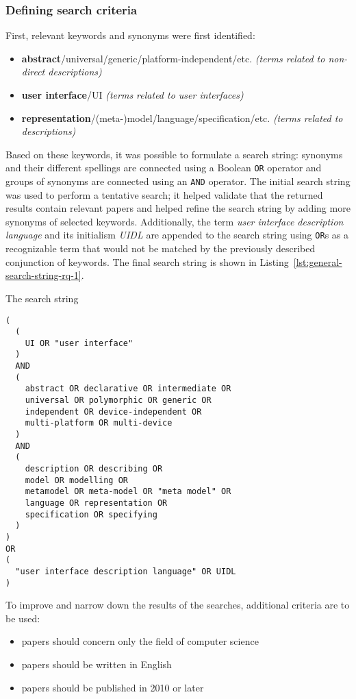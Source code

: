 \subsubsection{Defining search criteria}
First, relevant keywords and synonyms were first identified:
\begin{itemize}
    \item \textbf{abstract}/universal/generic/platform-independent/etc. \textit{(terms related to non-direct descriptions)}
    \item \textbf{user interface}/UI \textit{(terms related to user interfaces)}
    \item \textbf{representation}/(meta-)model/language/specification/etc. \textit{(terms related to descriptions)}
\end{itemize}
Based on these keywords, it was possible to formulate a search string: synonyms and their different spellings are connected using a Boolean \texttt{OR} operator and groups of synonyms are connected using an \texttt{AND} operator.
The initial search string was used to perform a tentative search;
it helped validate that the returned results contain relevant papers and helped refine the search string by adding more synonyms of selected keywords.
Additionally, the term \emph{user interface description language} and its initialism \emph{UIDL} are appended to the search string using \texttt{OR}s as a recognizable term that would not be matched by the previously described conjunction of keywords.
The final search string is shown in Listing~\ref{lst:general-search-string-rq-1}.
\begin{listing}
    \caption{The search string}
    \begin{verbatim}
(
  (
    UI OR "user interface"
  )
  AND
  (
    abstract OR declarative OR intermediate OR
    universal OR polymorphic OR generic OR
    independent OR device-independent OR
    multi-platform OR multi-device
  )
  AND
  (
    description OR describing OR
    model OR modelling OR
    metamodel OR meta-model OR "meta model" OR
    language OR representation OR
    specification OR specifying
  )
)
OR
(
  "user interface description language" OR UIDL
)
    \end{verbatim}
    \label{lst:general-search-string-rq-1}
\end{listing}

To improve and narrow down the results of the searches, additional criteria are to be used:
\begin{itemize}
    \item papers should concern only the field of computer science
    \item papers should be written in English
    \item papers should be published in 2010 or later
\end{itemize}

